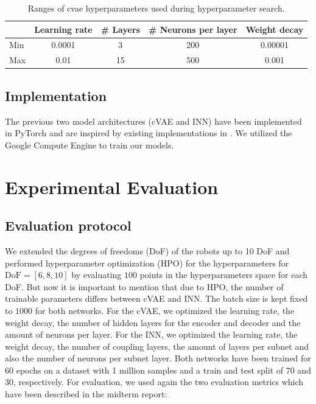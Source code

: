 \documentclass[conference]{IEEEtran}
\begin{document}
\begin{table}[h]
    \caption{Ranges of cvae hyperparameters used during hyperparameter search.}
    \label{tab:hyperparameter-ranges-cvae}
    \centering
    \begin{tabular}{|l|c|c|c|c|}
    \hline
      & Learning rate & \# Layers & \# Neurons per layer & Weight decay \\
     \hline
     Min  & 0.0001 & 3 & 200 & 0.00001 \\
     Max  & 0.01 & 15 & 500 & 0.001 \\
     \hline
    \end{tabular}
\end{table}

\subsection*{Implementation}

The previous two model architectures (cVAE and INN) have been implemented in PyTorch and are inspired by existing implementations in  \cite{graviraja2019, freia2020}. We utilized the Google Compute Engine to train our models.

\section*{Experimental Evaluation}

\subsection*{Evaluation protocol}

We extended the degrees of freedoms (DoF) of the robots up to 10 DoF and performed hyperparameter optimization (HPO) for the hyperparameters for $ \text{DoF} = [6, 8, 10]$ by evaluating $100$ points in the hyperparameters space for each DoF. But now it is important to mention that due to HPO, the number of trainable parameters differs between cVAE and INN. The batch size is kept fixed to $1000$ for both networks.
For the cVAE, we optimized the learning rate, the weight decay, the number of hidden layers for the encoder and decoder and the amount of neurons per layer. For the INN, we optimized the learning rate, the weight decay, the number of coupling layers, the amount of layers per subnet and also the number of neurons per subnet layer.
Both networks have been trained for 60 epochs on a dataset with 1 million samples and a train and test split of 70 and 30, respectively. For evaluation, we used again the two evaluation metrics which have been described in the midterm report:
\end{document}
